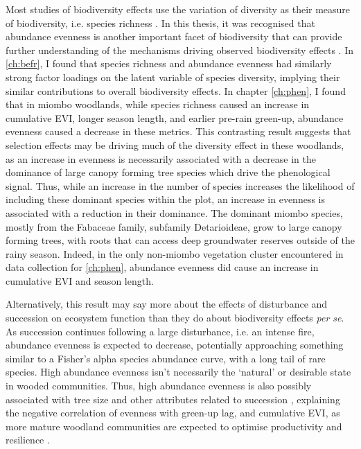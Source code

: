 \begin{refsection}
Most studies of biodiversity effects use the variation of diversity as their measure of biodiversity, i.e. species richness \citep{}. In this thesis, it was recognised that abundance evenness is another important facet of biodiversity that can provide further understanding of the mechanisms driving observed biodiversity effects \citep{}. In \autoref{ch:befr}, I found that species richness and abundance evenness had similarly strong factor loadings on the latent variable of species diversity, implying their similar contributions to overall biodiversity effects. In chapter \autoref{ch:phen}, I found that in miombo woodlands, while species richness caused an increase in cumulative EVI, longer season length, and earlier pre-rain green-up, abundance evenness caused a decrease in these metrics. This contrasting result suggests that selection effects may be driving much of the diversity effect in these woodlands, as an increase in evenness is necessarily associated with a decrease in the dominance of large canopy forming tree species which drive the phenological signal. Thus, while an increase in the number of species increases the likelihood of including these dominant species within the plot, an increase in evenness is associated with a reduction in their dominance. The dominant miombo species, mostly from the Fabaceae family, subfamily Detarioideae, grow to large canopy forming trees, with roots that can access deep groundwater reserves outside of the rainy season. Indeed, in the only non-miombo vegetation cluster encountered in data collection for \autoref{ch:phen}, abundance evenness did cause an increase in cumulative EVI and season length.

Alternatively, this result may say more about the effects of disturbance and succession on ecosystem function than they do about biodiversity effects \textit{per se}. As succession continues following a large disturbance, i.e. an intense fire, abundance evenness is expected to decrease, potentially approaching something similar to a Fisher's alpha species abundance curve, with a long tail of rare species. High abundance evenness isn't necessarily the `natural' or desirable state in wooded communities. Thus, high abundance evenness is also possibly associated with tree size and other attributes related to succession \citep{}, explaining the negative correlation of evenness with green-up lag, and cumulative EVI, as more mature woodland communities are expected to optimise productivity and resilience \citep{}.


\end{refsection}
